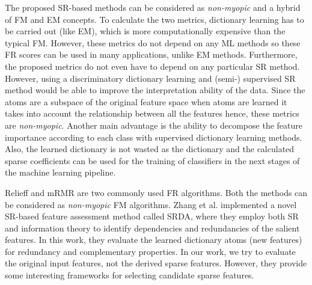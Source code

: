 The proposed SR-based methods can be considered as \textit{non-myopic} and a hybrid of FM and EM concepts. To calculate the two metrics, dictionary learning has to be carried out (like EM), which is more computationally expensive than the typical FM\@. However, these metrics do not depend on any ML methods so these FR scores can be used in many applications, unlike EM methods. Furthermore, the proposed metrics do not even have to depend on any particular SR method. However, using a discriminatory dictionary learning and (semi-) supervised SR method would be able to improve the interpretation ability of the data. Since the atoms are a subspace of the original feature space when atoms are learned it takes into account the relationship between all the features hence, these metrics are \textit{non-myopic}. Another main advantage is the ability to decompose the feature importance according to each class with supervised dictionary learning methods. Also, the learned dictionary is not wasted as the dictionary and the calculated sparse coefficients can be used for the training of classifiers in the next stages of the machine learning pipeline. 


Relieff\cite{Kononenko1997} and mRMR\cite{Ding2005} are two commonly used FR algorithms. Both the methods can be considered as \textit{non-myopic} FM algorithms. Zhang et al.\cite{Zhang2019} implemented a novel SR-based feature assessment method called SRDA, where they employ both SR and information theory to identify dependencies and redundancies of the salient features. In this work, they evaluate the learned dictionary atoms (new features) for redundancy and complementary properties. In our work, we try to evaluate the original input features, not the derived sparse features. However, they provide some interesting frameworks for selecting candidate sparse features.

 
